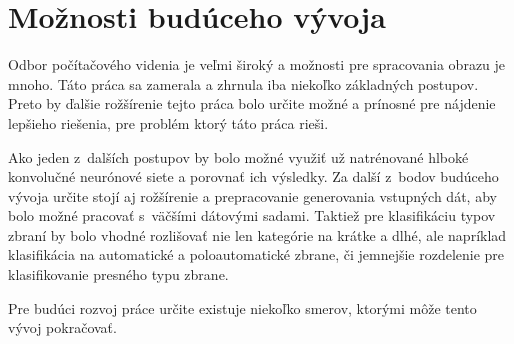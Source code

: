 
\section{Možnosti budúceho vývoja}

Odbor počítačového videnia je veľmi široký a možnosti pre spracovania obrazu je mnoho.
Táto práca sa zamerala a zhrnula iba niekoľko základných postupov.
Preto by ďalšie rožšírenie tejto práca bolo určite možné a prínosné pre nájdenie lepšieho riešenia, pre problém ktorý táto práca rieši.

Ako jeden z~dalších postupov by bolo možné využiť už natrénované hlboké konvolučné neurónové siete a porovnať ich výsledky.
Za další z~bodov budúceho vývoja určite stojí aj rožšírenie a prepracovanie generovania vstupných dát, aby bolo
    možné pracovať s~väčšími dátovými sadami.
Taktiež pre klasifikáciu typov zbraní by bolo vhodné rozlišovať nie len kategórie na krátke a dlhé, ale napríklad klasifikácia
    na automatické a poloautomatické zbrane, či jemnejšie rozdelenie pre klasifikovanie presného typu zbrane.

Pre budúci rozvoj práce určite existuje niekoľko smerov, ktorými môže tento vývoj pokračovať.
